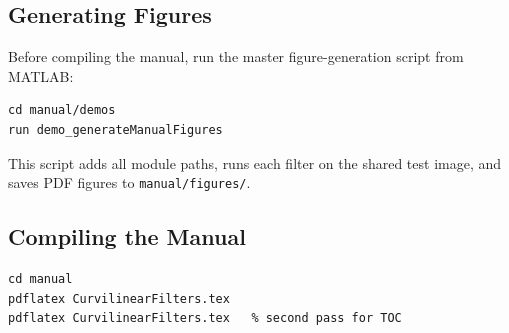 \documentclass[a4paper,justified]{tufte-book}
\begin{document}
\subsection{Generating Figures}

Before compiling the manual, run the master figure-generation script from
MATLAB:

\begin{lstlisting}
cd manual/demos
run demo_generateManualFigures
\end{lstlisting}

This script adds all module paths, runs each filter on the shared test image,
and saves PDF figures to \texttt{manual/figures/}.

\subsection{Compiling the Manual}

\begin{verbatim}
cd manual
pdflatex CurvilinearFilters.tex
pdflatex CurvilinearFilters.tex   % second pass for TOC
\end{verbatim}
\end{document}
